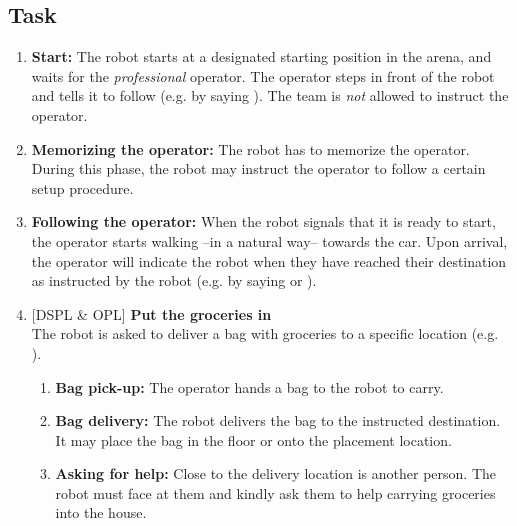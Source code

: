 \subsection{Task}
\begin{enumerate}
  \item \textbf{Start:} The robot starts at a designated starting position in the arena, and waits for the \textit{professional} operator. The operator steps in front of the robot and tells it to follow (e.g. by saying ). The team is \emph{not} allowed to instruct the operator.

  \item \textbf{Memorizing the operator:} The robot has to memorize the operator. During this phase, the robot may instruct the operator to follow a certain setup procedure.

  \item \textbf{Following the operator:} When the robot signals that it is ready to start, the operator starts walking --in a natural way-- towards the car. Upon arrival, the operator will indicate the robot when they have reached their destination as instructed by the robot (e.g. by saying  or ).

  \setcounter{enumTemp}{\theenumi}
  \item {[DSPL \& OPL]} \textbf{Put the groceries in} \\
  The robot is asked to deliver a bag with groceries to a specific location (e.g. ).
  \begin{enumerate}
    \item \textbf{Bag pick-up:} The operator hands a bag to the robot to carry.

    \item \textbf{Bag delivery:} The robot delivers the bag to the instructed destination. It may place the bag in the floor or onto the placement location.

    \item \textbf{Asking for help:} Close to the delivery location is another person. The robot must face at them and kindly ask them to help carrying groceries into the house.
  \end{enumerate}


\end{enumerate}
